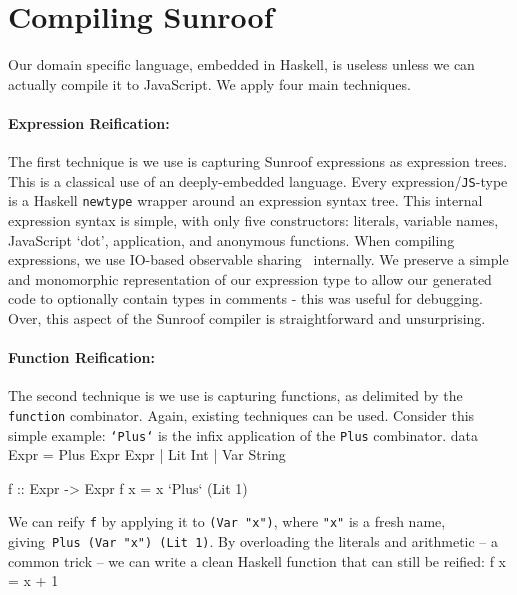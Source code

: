 \documentclass{llncs}
\newcommand{\Src}[1]{{\tt{#1}}}
\newenvironment{Code}{\verbatim}{\endverbatim}
\begin{document}

\section{Compiling Sunroof}
\label{sec:compiler}

Our domain specific language, embedded in Haskell, is useless unless
we can actually compile it to JavaScript. We apply four main techniques.

\paragraph{Expression Reification:}
The first technique is we use is capturing Sunroof expressions as expression trees. 
This is a classical use of an deeply-embedded language. Every expression/\Src{JS}-type
is a Haskell \Src{newtype} wrapper around an expression syntax tree.
This internal expression syntax is simple, with only five constructors:
literals, variable names, JavaScript `dot', application, and anonymous functions.
When compiling expressions, we use IO-based observable sharing~\cite{...} internally.
We preserve a simple and monomorphic representation of our expression
type to allow our generated code to optionally contain types in comments -
this was useful for debugging.
Over, this aspect of the Sunroof compiler is straightforward and unsurprising.

\paragraph{Function Reification:}
The second technique is we use is capturing functions, as delimited
by the \Src{function} combinator. Again, existing techniques can be used.
Consider this simple example: \Src{`Plus`} is the infix application of
the \Src{Plus} combinator.
\begin{Code}
data Expr = Plus Expr Expr | Lit Int | Var String

f :: Expr -> Expr
f x = x `Plus` (Lit 1)
\end{Code}

We can reify \Src{f} by applying it to \Src{(Var "x")}, where \Src{"x"} is a fresh name,
giving~\Src{Plus (Var "x") (Lit 1)}. By overloading the literals and arithmetic -- 
a common trick -- we can write a clean Haskell function that can still be reified:
\begin{Code}
f  x = x + 1
\end{Code}
\end{document}
